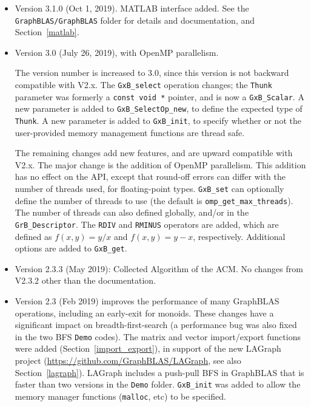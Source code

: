 \documentclass[12pt]{article}
\begin{document}
\begin{itemize}

\item Version 3.1.0 (Oct 1, 2019).  MATLAB interface added.
    See the \newline
    \verb'GraphBLAS/GraphBLAS' folder for details and documentation,
    and Section~\ref{matlab}.

\item Version 3.0 (July 26, 2019), with OpenMP parallelism.

The version number is increased to 3.0, since
this version is not backward compatible with V2.x.  The \verb'GxB_select'
operation changes; the \verb'Thunk' parameter was formerly a
\verb'const void *' pointer, and is now a \verb'GxB_Scalar'.  A new parameter
is added to \verb'GxB_SelectOp_new', to define the expected type of
\verb'Thunk'.  A new parameter is added to \verb'GxB_init', to specify whether
or not the user-provided memory management functions are thread safe.

The remaining changes add new features, and are upward compatible with V2.x.
The major change is the addition of OpenMP parallelism.  This addition has no
effect on the API, except that round-off errors can differ with the number of
threads used, for floating-point types.  \verb'GxB_set' can optionally define
the number of threads to use (the default is \verb'omp_get_max_threads').  The
number of threads can also defined globally, and/or in the
\verb'GrB_Descriptor'.  The \verb'RDIV' and \verb'RMINUS' operators are added,
which are defined as $f(x,y)=y/x$ and $f(x,y)=y-x$, respectively.  Additional
options are added to \verb'GxB_get'.

\item Version 2.3.3 (May 2019): Collected Algorithm of the ACM.
No changes from V2.3.2 other than the documentation.

\item Version 2.3 (Feb 2019) improves the performance of many GraphBLAS
operations, including an early-exit for monoids.  These changes have a
significant impact on breadth-first-search (a performance bug was also fixed in
the two BFS \verb'Demo' codes).  The matrix and vector import/export functions
were added (Section~\ref{import_export}), in support of the new LAGraph project
(\url{https://github.com/GraphBLAS/LAGraph}, see also Section~\ref{lagraph}).
LAGraph includes a push-pull BFS in GraphBLAS that is faster than two versions
in the \verb'Demo' folder.  \verb'GxB_init' was added to allow the memory
manager functions (\verb'malloc', etc) to be specified.


\end{itemize}
\end{document}

